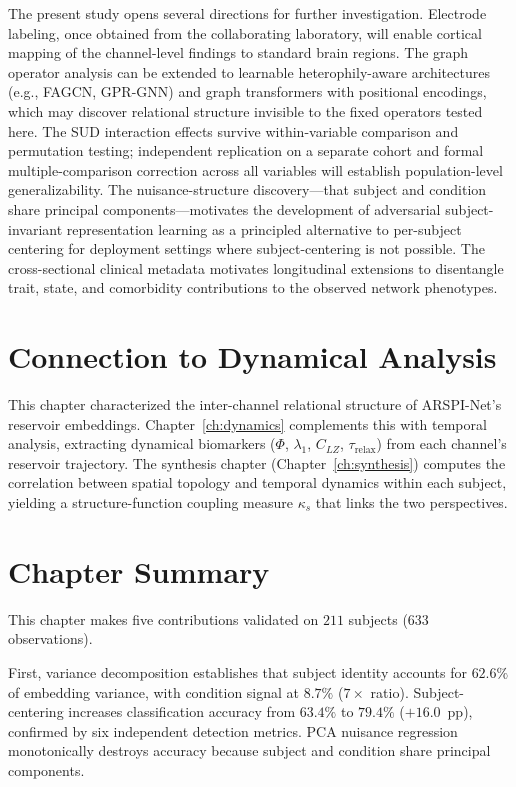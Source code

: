 The present study opens several directions for further investigation. Electrode labeling, once obtained from the collaborating laboratory, will enable cortical mapping of the channel-level findings to standard brain regions. The graph operator analysis can be extended to learnable heterophily-aware architectures (e.g., FAGCN, GPR-GNN) and graph transformers with positional encodings, which may discover relational structure invisible to the fixed operators tested here. The SUD interaction effects survive within-variable comparison and permutation testing; independent replication on a separate cohort and formal multiple-comparison correction across all variables will establish population-level generalizability. The nuisance-structure discovery---that subject and condition share principal components---motivates the development of adversarial subject-invariant representation learning as a principled alternative to per-subject centering for deployment settings where subject-centering is not possible. The cross-sectional clinical metadata motivates longitudinal extensions to disentangle trait, state, and comorbidity contributions to the observed network phenotypes.


\section{Connection to Dynamical Analysis}
\label{sec:ch5_bridge}

This chapter characterized the inter-channel relational structure of ARSPI-Net's reservoir embeddings. Chapter~\ref{ch:dynamics} complements this with temporal analysis, extracting dynamical biomarkers ($\Phi$, $\lambda_1$, $C_{LZ}$, $\tau_{\text{relax}}$) from each channel's reservoir trajectory. The synthesis chapter (Chapter~\ref{ch:synthesis}) computes the correlation between spatial topology and temporal dynamics within each subject, yielding a structure-function coupling measure $\kappa_s$ that links the two perspectives.


\section{Chapter Summary}
\label{sec:ch5_summary}

This chapter makes five contributions validated on $211$ subjects ($633$ observations).

First, variance decomposition establishes that subject identity accounts for $62.6\%$ of embedding variance, with condition signal at $8.7\%$ ($7\times$ ratio). Subject-centering increases classification accuracy from $63.4\%$ to $79.4\%$ ($+16.0$~pp), confirmed by six independent detection metrics. PCA nuisance regression monotonically destroys accuracy because subject and condition share principal components.

